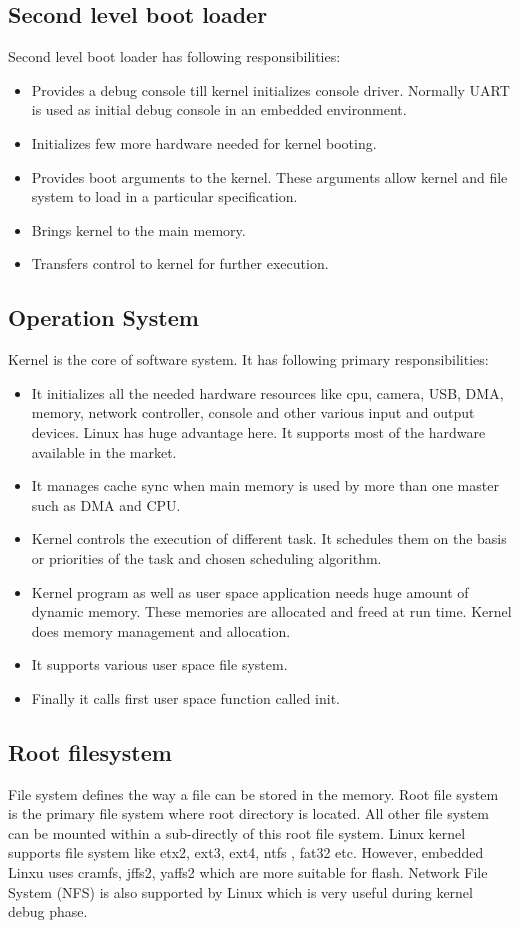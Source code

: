 \subsection {Second level boot loader}
\indent Second level boot loader has following responsibilities:
\begin{itemize}
	\item Provides a debug console till kernel initializes
		console driver. Normally UART is used as initial debug
		console in an embedded environment.
	\item Initializes few more hardware needed for kernel booting.
	\item Provides boot arguments to the kernel. These arguments
		allow kernel and file system to load in a particular
		specification.
	\item Brings kernel to the main memory.
	\item Transfers control to kernel for further execution.
\end{itemize}
\subsection {Operation System}
\indent Kernel is the core of software system. It has following primary
responsibilities:
\begin{itemize}
	\item It initializes all the needed hardware resources like
		cpu, camera, USB, DMA, memory, network controller,
		console and other various input and output devices.
		Linux has huge advantage here. It supports most of the
		hardware available in the market.
	\item It manages cache sync when main memory is used by more
		than one master such as DMA and CPU.
	\item Kernel controls the execution of different task. It
		schedules them on the basis or priorities of the task
		and chosen scheduling algorithm.
	\item Kernel program as well as user space application needs
		huge amount of dynamic memory. These memories are
		allocated and freed at run time. Kernel does memory
		management and allocation.
	\item It supports various user space file system.
	\item Finally it calls first user space function called init.
\end{itemize}
\subsection {Root filesystem}
\indent	File system defines the way a file can be stored in the memory.
Root file system is the primary file system where root directory is
located. All other file system can be mounted within a sub-directly of
this root file system. Linux kernel supports file system like etx2,
ext3, ext4, ntfs , fat32 etc. However, embedded Linxu uses cramfs,
jffs2, yaffs2 which are more suitable for flash. Network File System
(NFS) is also supported by Linux which is very useful during kernel
debug phase.

